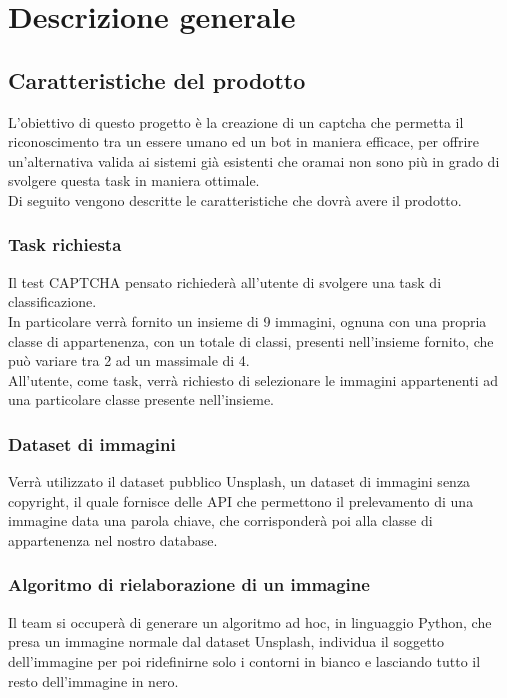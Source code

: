 \section{Descrizione generale}

\subsection{Caratteristiche del prodotto}
L'obiettivo di questo progetto è la creazione di un captcha che permetta il riconoscimento tra un essere umano ed un bot in maniera efficace, per offrire un'alternativa valida ai sistemi già esistenti che oramai non sono più in grado di svolgere questa task in maniera ottimale.\\

\noindent Di seguito vengono descritte le caratteristiche che dovrà avere il prodotto.

\subsubsection{Task richiesta}
Il test CAPTCHA pensato richiederà all'utente di svolgere una task di classificazione.\\
In particolare verrà fornito un insieme di 9 immagini, ognuna con una propria classe di appartenenza, con un totale di classi, presenti nell'insieme fornito, che può variare tra 2 ad un massimale di 4.\\
All'utente, come task, verrà richiesto di selezionare le immagini appartenenti ad una particolare classe presente nell'insieme.

\subsubsection{Dataset di immagini}
Verrà utilizzato il dataset pubblico Unsplash, un dataset di immagini senza copyright, il quale fornisce delle API che permettono il prelevamento di una immagine data una parola chiave, che corrisponderà poi alla classe di appartenenza nel nostro database.

\subsubsection{Algoritmo di rielaborazione di un immagine}
Il team si occuperà di generare un algoritmo ad hoc, in linguaggio Python, che presa un immagine normale dal dataset Unsplash, individua il soggetto dell'immagine per poi ridefinirne solo i contorni in bianco e lasciando tutto il resto dell'immagine in nero.  

